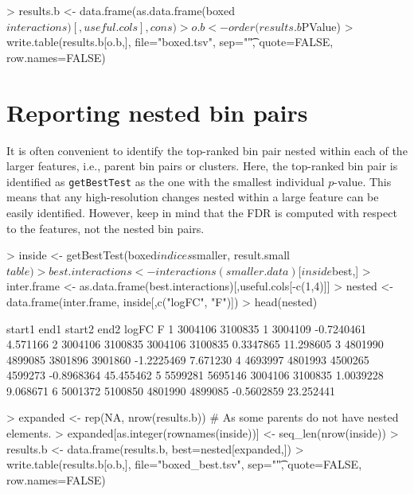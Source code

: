 \documentclass[12pt]{report}
\renewenvironment{Schunk}{\vspace{0pt}}{\vspace{0pt}}
\newcommand{\code}[1]{{\small\texttt{#1}}}
\begin{document}
\begin{Schunk}
\begin{Sinput}
> results.b <- data.frame(as.data.frame(boxed$interactions)[,useful.cols], cons)
> o.b <- order(results.b$PValue)
> write.table(results.b[o.b,], file="boxed.tsv", sep="\t", quote=FALSE, row.names=FALSE)
\end{Sinput}
\end{Schunk}

\section{Reporting nested bin pairs}
\label{sec:nesting}
It is often convenient to identify the top-ranked bin pair nested within each of the larger features, i.e., parent bin pairs or clusters.
Here, the top-ranked bin pair is identified as \code{getBestTest} as the one with the smallest individual $p$-value.
This means that any high-resolution changes nested within a large feature can be easily identified.
However, keep in mind that the FDR is computed with respect to the features, not the nested bin pairs.

\begin{Schunk}
\begin{Sinput}
> inside <- getBestTest(boxed$indices$smaller, result.small$table)
> best.interactions <- interactions(smaller.data)[inside$best,]
> inter.frame <- as.data.frame(best.interactions)[,useful.cols[-c(1,4)]]
> nested <- data.frame(inter.frame, inside[,c("logFC", "F")])
> head(nested)
\end{Sinput}
\begin{Soutput}
   start1    end1  start2    end2      logFC         F
1 3004106 3100835       1 3004109 -0.7240461  4.571166
2 3004106 3100835 3004106 3100835  0.3347865 11.298605
3 4801990 4899085 3801896 3901860 -1.2225469  7.671230
4 4693997 4801993 4500265 4599273 -0.8968364 45.455462
5 5599281 5695146 3004106 3100835  1.0039228  9.068671
6 5001372 5100850 4801990 4899085 -0.5602859 23.252441
\end{Soutput}
\begin{Sinput}
> expanded <- rep(NA, nrow(results.b)) # As some parents do not have nested elements.
> expanded[as.integer(rownames(inside))] <- seq_len(nrow(inside))
> results.b <- data.frame(results.b, best=nested[expanded,])
> write.table(results.b[o.b,], file="boxed_best.tsv", sep="\t", quote=FALSE, row.names=FALSE)
\end{Sinput}
\end{Schunk}
\end{document}
